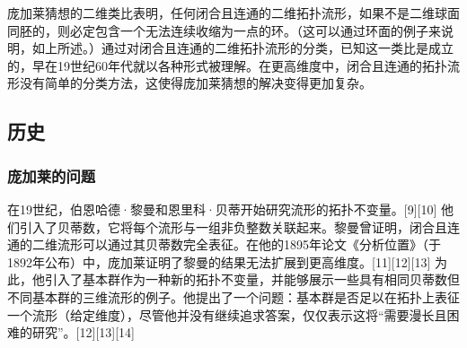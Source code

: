 庞加莱猜想的二维类比表明，任何闭合且连通的二维拓扑流形，如果不是二维球面同胚的，则必定包含一个无法连续收缩为一点的环。（这可以通过环面的例子来说明，如上所述。）通过对闭合且连通的二维拓扑流形的分类，已知这一类比是成立的，早在19世纪60年代就以各种形式被理解。在更高维度中，闭合且连通的拓扑流形没有简单的分类方法，这使得庞加莱猜想的解决变得更加复杂。
\subsection{历史}  
\subsubsection{庞加莱的问题}  
在19世纪，伯恩哈德·黎曼和恩里科·贝蒂开始研究流形的拓扑不变量。[9][10] 他们引入了贝蒂数，它将每个流形与一组非负整数关联起来。黎曼曾证明，闭合且连通的二维流形可以通过其贝蒂数完全表征。在他的1895年论文《分析位置》（于1892年公布）中，庞加莱证明了黎曼的结果无法扩展到更高维度。[11][12][13] 为此，他引入了基本群作为一种新的拓扑不变量，并能够展示一些具有相同贝蒂数但不同基本群的三维流形的例子。他提出了一个问题：基本群是否足以在拓扑上表征一个流形（给定维度），尽管他并没有继续追求答案，仅仅表示这将“需要漫长且困难的研究”。[12][13][14]
